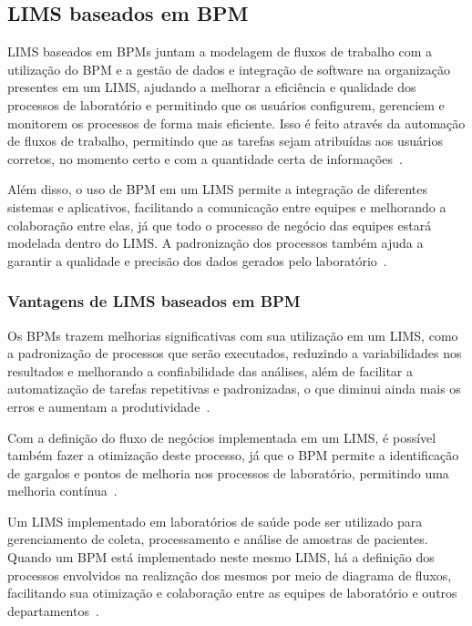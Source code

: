 \subsection{LIMS baseados em BPM}


LIMS baseados em BPMs juntam a modelagem de fluxos de trabalho com a utilização do BPM e a gestão de dados e integração de software na organização presentes em um LIMS, ajudando a melhorar a eficiência e qualidade dos processos de laboratório e permitindo que os usuários configurem, gerenciem e monitorem os processos de forma mais eficiente. Isso é feito através da automação de fluxos de trabalho, permitindo que as tarefas sejam atribuídas aos usuários corretos, no momento certo e com a quantidade certa de informações~\cite{LIMS-BPMSLaboratory, LIMS-BPMSLaboratoryb}.

Além disso, o uso de BPM em um LIMS permite a integração de diferentes sistemas e aplicativos, facilitando a comunicação entre equipes e melhorando a colaboração entre elas, já que todo o processo de negócio das equipes estará modelada dentro do LIMS. A padronização dos processos também ajuda a garantir a qualidade e precisão dos dados gerados pelo laboratório~\cite{LIMS-BPMSLaboratory, LIMS-BPMSLaboratoryb}.


\subsubsection{Vantagens de LIMS baseados em BPM}

Os BPMs trazem melhorias significativas com sua utilização em um LIMS, como a padronização de processos que serão executados, reduzindo a variabilidades nos resultados e melhorando a confiabilidade das análises, além de facilitar a automatização de tarefas repetitivas e padronizadas, o que diminui ainda mais os erros e aumentam a produtividade~\cite{LIMS-BPMSLaboratory, LIMS-BPMSLaboratoryb}.

Com a definição do fluxo de negócios implementada em um LIMS, é possível também fazer a otimização deste processo, já que o BPM permite a identificação de gargalos e pontos de melhoria nos processos de laboratório, permitindo uma melhoria contínua~\cite{Ko2009BusinessSurvey}.

Um LIMS implementado em laboratórios de saúde pode ser utilizado para gerenciamento de coleta, processamento e análise de amostras de pacientes. Quando um BPM está implementado neste mesmo LIMS, há a definição dos processos envolvidos na realização dos mesmos por meio de diagrama de fluxos, facilitando sua otimização e colaboração entre as equipes de laboratório e outros departamentos~\cite{LIMS-BPMSLaboratory, LIMS-BPMSLaboratoryb}.

